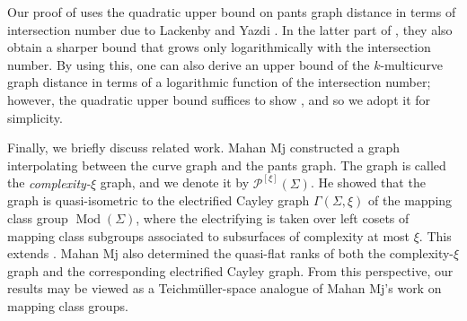 \documentclass[a4paper,11pt]{amsart}
\numberwithin{equation}{section}
\theoremstyle{definition}
\DeclareMathOperator{\Mod}{Mod}
\newcommand{\interpolate}[1]{\mathcal{P}^{[#1]}}
\begin{document}
Our proof of  uses the quadratic upper bound on pants graph distance in terms of intersection number due to Lackenby and Yazdi \cite{lackenby2024bounds}.
In the latter part of \cite{lackenby2024bounds}, they also obtain a sharper bound that grows only logarithmically with the intersection number.
By using this, one can also derive an upper bound of the $k$-multicurve graph distance in terms of a logarithmic function of the intersection number; however, the quadratic upper bound suffices to show , and so we adopt it for simplicity.

Finally, we briefly discuss related work.
Mahan Mj \cite{mj2009interpolating} constructed a graph interpolating between the curve graph and the pants graph.
The graph is called the \textit{complexity-$\xi$} graph, and we denote it by $\interpolate{\xi}(\Sigma)$.
He showed that the graph is quasi-isometric to the electrified Cayley graph $\Gamma(\Sigma,\xi)$ of the mapping class group $\Mod(\Sigma)$, where the electrifying is taken over left cosets of mapping class subgroups associated to subsurfaces of complexity at most $\xi$.
This extends \cite[Theorem~1.3]{masur1999complex}.
Mahan Mj also determined the quasi-flat ranks of both the complexity-$\xi$ graph and the corresponding electrified Cayley graph.
From this perspective, our results may be viewed as a Teichmüller-space analogue of Mahan Mj's work on mapping class groups.
\end{document}
